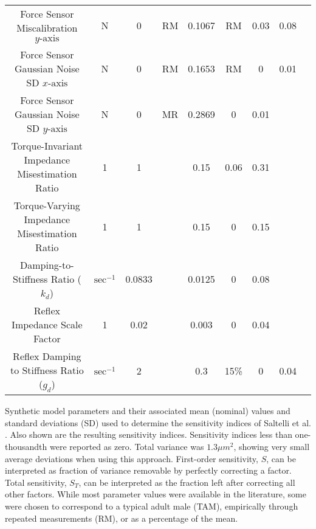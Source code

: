 \documentclass[10pt]{article}
\begin{document}
\begin{table}[!ht]
\begin{tabular}{|c|c|c c|c c|c c|c|}
Force Sensor Miscalibration $y\text{-axis}$ &
N &
0 &
RM &
0.1067 &
RM &
0.03 &
0.08 \\
Force Sensor Gaussian Noise SD $x\text{-axis}$ &
N &
0 &
RM &
0.1653 &
RM &
0 &
0.01 \\
Force Sensor Gaussian Noise SD $y\text{-axis}$ &
N &
0 &
MR &
0.2869 &
0 &
0.01 \\
Torque-Invariant Impedance Misestimation Ratio &
1 &
1 &
\cite{burdet2006stability} &
0.15 &
0.06 &
0.31 \\
Torque-Varying Impedance Misestimation Ratio &
1 &
1 &
\cite{burdet2006stability} &
0.15 &
0 &
0.15 \\
Damping-to-Stiffness Ratio ($k_d$) &
$\text{sec}^{-1}$ &
0.0833 &
\cite{burdet2006stability} &
0.0125 &
0 &
0.08 \\
Reflex Impedance Scale Factor &
1 &
0.02 &
\cite{burdet2006stability} &
0.003 &
0 &
0.04 \\
Reflex Damping to Stiffness Ratio ($g_d$) &
$\text{sec}^{-1}$ &
2 &
\cite{burdet2006stability} &
0.3 &
15\% &
0 &
0.04 \\ \hline
\end{tabular}
\begin{flushleft}Synthetic model parameters and their associated mean (nominal) values and standard deviations (SD) used to determine the sensitivity indices of Saltelli et al. \cite{saltelli2010variance}. Also shown are the resulting sensitivity indices. Sensitivity indices less than one-thousandth were reported as zero. Total variance was $1.3 \mu m^2$, showing very small average deviations when using this approach. First-order sensitivity, $S$, can be interpreted as fraction of variance removable by perfectly correcting a factor. Total sensitivity, $S_T$, can be interpreted as the fraction left after correcting all other factors. While most parameter values were available in the literature, some were chosen to correspond to a typical adult male (TAM), empirically through repeated measurements (RM), or as a percentage of the mean.
\end{flushleft}
\label{tab:parameters}
\end{table}
\end{document}
